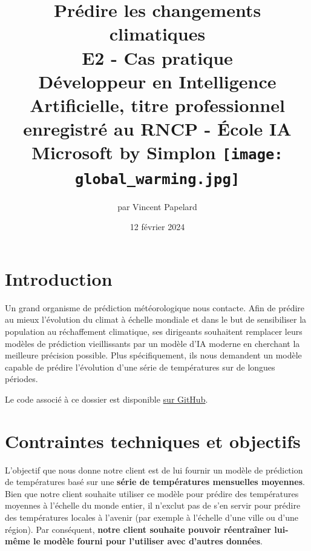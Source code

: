 \documentclass[french]{article}
\title{%
    \huge Prédire les changements climatiques  \\
    \bigskip
    \large E2 - Cas pratique \\ 
    Développeur en Intelligence Artificielle,
    titre professionnel enregistré au RNCP - École IA Microsoft by Simplon
    \vfill
    \texttt{[image: global\_warming.jpg]}
    \vfill}
\date{12 février 2024}
\author{par Vincent Papelard}
\begin{document}
    \renewcommand{\contentsname}{Table des Matières}
    \renewcommand{\refname}{Références}
    \maketitle
    \newpage
    \tableofcontents
    \newpage

    \section*{Introduction}

    Un grand organisme de prédiction météorologique nous contacte. 
    Afin de prédire au mieux l'évolution du climat à échelle mondiale et dans le but de sensibiliser la population au réchaffement climatique, ses dirigeants souhaitent remplacer leurs modèles de prédiction vieillissants par un modèle d'IA moderne en cherchant la meilleure précision possible. Plus spécifiquement, ils nous demandent un modèle capable de prédire l'évolution d'une série de températures sur de longues périodes. 
    
    Le code associé à ce dossier est disponible \href{https://github.com/vinpap/predict_climate_change}{sur GitHub}.


    \section{Contraintes techniques et objectifs}

    L'objectif que nous donne notre client est de lui fournir un modèle de prédiction de températures basé sur une \textbf{série de températures mensuelles moyennes}. Bien que notre client souhaite utiliser ce modèle pour prédire des températures moyennes à l'échelle du monde entier, il n'exclut pas de s'en servir pour prédire des températures locales à l'avenir (par exemple à l'échelle d'une ville ou d'une région). Par conséquent, \textbf{notre client souhaite pouvoir réentraîner lui-même le modèle fourni pour l'utiliser avec d'autres données}.
\end{document}
